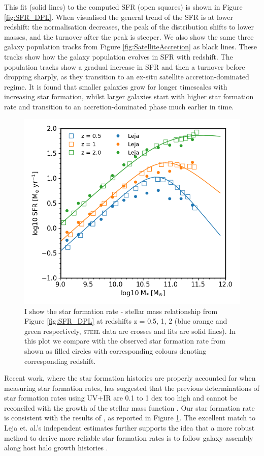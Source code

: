 This fit (solid lines) to the computed SFR (open squares) is shown in Figure \ref{fig:SFR_DPL}. When visualised the general trend of the SFR is at lower redshift: the normalisation decreases, the peak of the distribution shifts to lower masses, and the turnover after the peak is steeper. We also show the same three galaxy population tracks from Figure \ref{fig:SatelliteAccretion} as black lines. These tracks show how the galaxy population evolves in SFR with redshift. The population tracks show a gradual increase in SFR and then a turnover before dropping sharply, as they transition to an ex-situ satellite accretion-dominated regime. It is found that smaller galaxies grow for longer timescales with increasing star formation, whilst larger galaxies start with higher star formation rate and transition to an accretion-dominated phase much earlier in time.

\begin{figure}[h]
	\centering
	\includegraphics[width = 0.8\linewidth]{Figures/Chapter4/HMC_DPL_wLeja.png}
    \caption{I show the star formation rate - stellar mass relationship from Figure \ref{fig:SFR_DPL} at redshifts z = 0.5, 1, 2 (blue orange and green respectively, \textsc{steel} data are crosses and fits are solid lines). In this plot we compare with the observed star formation rate from \citet{Leja2019AnSurvey} shown as filled circles with corresponding colours denoting corresponding redshift.}
	\label{fig:SFR_L18}
\end{figure}

Recent work, where the star formation histories are properly accounted for when measuring star formation rates, has suggested that the previous determinations of star formation rates using UV+IR are 0.1 to 1 dex too high \citep{Leja2019AnSurvey} and cannot be reconciled with the growth of the stellar mass function \citep{Leja2015ReconcilingFunction, Lapi2017StellarEquation}. Our star formation rate is consistent with the results of \citet{Leja2019AnSurvey}, as reported in Figure \ref{fig:SFR_L18}. The excellent match to Leja et. al.'s independent estimates further supports the idea that a more robust method to derive more reliable star formation rates is to follow galaxy assembly along host halo growth histories \citep[see e.g.,][]{Moster2018Emerge10}. 

